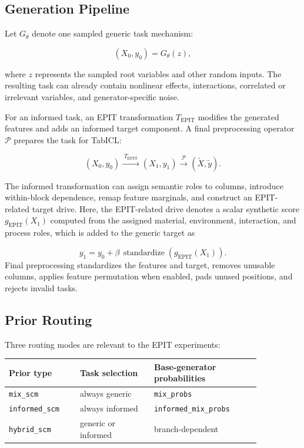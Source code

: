 \documentclass{article}
\begin{document}
\subsection{Generation Pipeline}

Let \(G_{\theta}\) denote one sampled generic task mechanism:

\[
(X_0,y_0)=G_{\theta}(z),
\]

where \(z\) represents the sampled root variables and other random inputs. The resulting task can already contain nonlinear effects, interactions, correlated or irrelevant variables, and generator-specific noise.

For an informed task, an EPIT transformation \(T_{\mathrm{EPIT}}\) modifies the generated features and adds an informed target component. A final preprocessing operator \(\mathcal{P}\) prepares the task for TabICL:

\begin{equation}
(X_0,y_0)
\xrightarrow{\;T_{\mathrm{EPIT}}\;}
(X_1,y_1)
\xrightarrow{\;\mathcal{P}\;}
(\widetilde X,\widetilde y).
\label{eq:informed-pipeline}
\end{equation}

The informed transformation can assign semantic roles to columns, introduce within-block dependence, remap feature marginals, and construct an EPIT-related target drive. Here, the EPIT-related drive denotes a scalar synthetic score
\(g_{\mathrm{EPIT}}(X_1)\) computed from the assigned material, environment,
interaction, and process roles, which is added to the generic target as

\begin{equation}
y_1
=
y_0
+
\beta\,
\operatorname{standardize}
\left(g_{\mathrm{EPIT}}(X_1)\right).
\end{equation} Final preprocessing standardizes the features and target, removes unusable columns, applies feature permutation when enabled, pads unused positions, and rejects invalid tasks.

\subsection{Prior Routing}

Three routing modes are relevant to the EPIT experiments:

\begin{center}
\small
\begin{tabular}{p{0.24\linewidth}p{0.25\linewidth}p{0.36\linewidth}}
\hline
\textbf{Prior type} & \textbf{Task selection} & \textbf{Base-generator probabilities} \\
\hline
\texttt{mix\_scm} & always generic & \texttt{mix\_probs} \\
\texttt{informed\_scm} & always informed & \texttt{informed\_mix\_probs} \\
\texttt{hybrid\_scm} & generic or informed & branch-dependent \\
\hline
\end{tabular}
\end{center}
\end{document}

